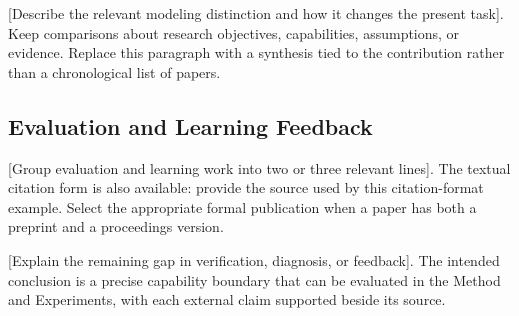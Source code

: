[Describe the relevant modeling distinction and how it changes the present task]. Keep comparisons about research objectives, capabilities, assumptions, or evidence. Replace this paragraph with a synthesis tied to the contribution rather than a chronological list of papers.

\subsection{Evaluation and Learning Feedback}
[Group evaluation and learning work into two or three relevant lines]. The textual citation form is also available: \citet{vaswani2017attention} provide the source used by this citation-format example. Select the appropriate formal publication when a paper has both a preprint and a proceedings version.

[Explain the remaining gap in verification, diagnosis, or feedback]. The intended conclusion is a precise capability boundary that can be evaluated in the Method and Experiments, with each external claim supported beside its source.
